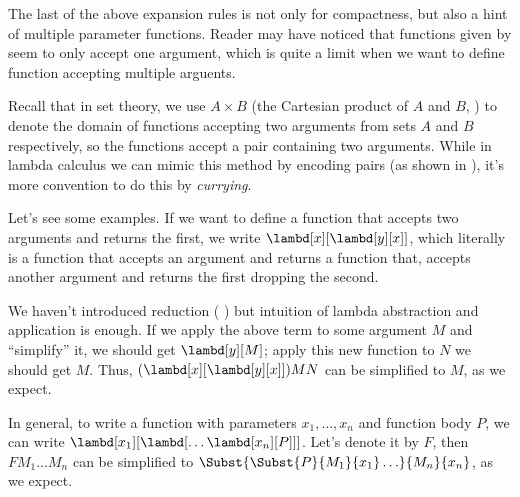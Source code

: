 \documentclass[../../../include/open-logic-section]{subfiles}
\begin{document}

The last of the above expansion rules is not only for compactness, but
also a hint of multiple parameter functions. Reader may have noticed
that functions given by  seem to only accept one argument, which
is quite a limit when we want to define function accepting multiple
arguents.

Recall that in set theory, we use $A \times B$ (the Cartesian product
of $A$ and $B$, \olref[sfr][set][pai]) to denote the domain of functions accepting two
arguments from sets $A$ and $B$ respectively, so the functions accept
a pair containing two arguments. While in lambda calculus we can mimic
this method by encoding pairs (as shown in ), it's
more convention to do this by \emph{currying}.

Let's see some examples. If we want to define a function that accepts
two arguments and returns the first, we write
$\lambd[x][\lambd[y][x]]$, which literally is a function that accepts
an argument and returns a function that, accepts another argument and
returns the first dropping the second. 

We haven't introduced reduction ( ) but intuition
of lambda abstraction and application is enough. If we apply the above
term to some argument $M$ and ``simplify'' it, we should get $\lambd[y][M]$; apply this new function to $N$
we should get $M$. Thus, $(\lambd[x][\lambd[y][x]])MN$ can be
simplified to $M$, as we expect.

In general, to write a function with parameters $x_1, \ldots, x_n$
and function body $P$, we can write
$\lambd[x_1][\lambd[\ldots\lambd[x_n][P]]]$. Let's denote it by $F$,
then $FM_1\ldots M_n$ can be simplified to
$\Subst{\Subst{P}{M_1}{x_1}\ldots}{M_n}{x_n}$, as we expect.
\end{document}
